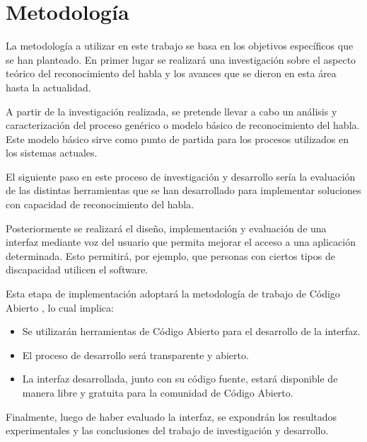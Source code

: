 \section{Metodolog\'{i}a}
\label{sec:metodologia}

La metodolog\'{i}a a utilizar en este trabajo se basa en los objetivos espec\'{i}ficos que se 
han planteado. En primer lugar se realizar\'{a} una investigaci\'{o}n sobre el aspecto te\'{o}rico 
del reconocimiento del habla y los avances que se dieron en esta \'{a}rea hasta la actualidad.

A partir de la investigaci\'{o}n realizada, se pretende llevar a cabo un an\'{a}lisis y 
caracterizaci\'{o}n del proceso gen\'{e}rico o modelo b\'{a}sico de reconocimiento del habla. 
Este modelo b\'{a}sico sirve como punto de partida para los procesos utilizados en los sistemas actuales.

El siguiente paso en este proceso de investigaci\'{o}n y desarrollo ser\'{i}a la evaluaci\'{o}n de las 
distintas herramientas que se han desarrollado para implementar soluciones con 
capacidad de reconocimiento del habla.

Posteriormente se realizar\'{a} el dise\~{n}o, implementaci\'{o}n y evaluaci\'{o}n de una interfaz mediante
voz del usuario que permita mejorar el acceso a una aplicaci\'{o}n determinada. Esto permitir\'{a}, por ejemplo, 
que personas con ciertos tipos de discapacidad utilicen el software. 

Esta etapa de implementaci\'{o}n adoptar\'{a} la metodolog\'{i}a de trabajo de C\'{o}digo
Abierto \cite{WikipediaOpenSource}, lo cual implica:  

\begin{itemize}
    \item Se utilizar\'{a}n herramientas de C\'{o}digo Abierto para el desarrollo de la interfaz. 

    \item El proceso de desarrollo ser\'{a} transparente y abierto. 
    
    \item La interfaz desarrollada, junto con su c\'{o}digo fuente, estar\'{a} disponible de manera libre 
    y gratuita para la comunidad de C\'{o}digo Abierto.
\end{itemize}

Finalmente, luego de haber evaluado la interfaz, se expondr\'{a}n los resultados experimentales y las 
conclusiones del trabajo de investigaci\'{o}n y desarrollo.
